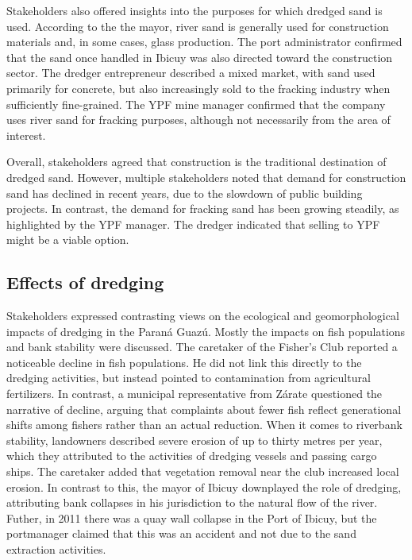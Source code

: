 Stakeholders also offered insights into the purposes for which dredged sand is used. According to the the mayor, river sand is generally used for construction materials and, in some cases, glass production. The port administrator confirmed that the sand once handled in Ibicuy was also directed toward the construction sector. The dredger entrepreneur described a mixed market, with sand used primarily for concrete, but also increasingly sold to the fracking industry when sufficiently fine-grained. The YPF mine manager confirmed that the company uses river sand for fracking purposes, although not necessarily from the area of interest.

Overall, stakeholders agreed that construction is the traditional destination of dredged sand. However, multiple stakeholders noted that demand for construction sand has declined in recent years, due to the slowdown of public building projects. In contrast, the demand for fracking sand has been growing steadily, as highlighted by the YPF manager. The dredger indicated that selling to YPF might be a viable option.

\subsection{Effects of dredging}
Stakeholders expressed contrasting views on the ecological and geomorphological impacts of dredging in the Paraná Guazú. Mostly the impacts on fish populations and bank stability were discussed. The caretaker of the Fisher’s Club reported a noticeable decline in fish populations. He did not link this directly to the dredging activities, but instead pointed to contamination from agricultural fertilizers. In contrast, a municipal representative from Zárate questioned the narrative of decline, arguing that complaints about fewer fish reflect generational shifts among fishers rather than an actual reduction. When it comes to riverbank stability, landowners described severe erosion of up to thirty metres per year, which they attributed to the activities of dredging vessels and passing cargo ships. The caretaker added that vegetation removal near the club increased local erosion. In contrast to this, the mayor of Ibicuy downplayed the role of dredging, attributing bank collapses in his jurisdiction to the natural flow of the river. Futher, in 2011 there was a quay wall collapse in the Port of Ibicuy, but the portmanager claimed that this was an accident and not due to the sand extraction activities.

